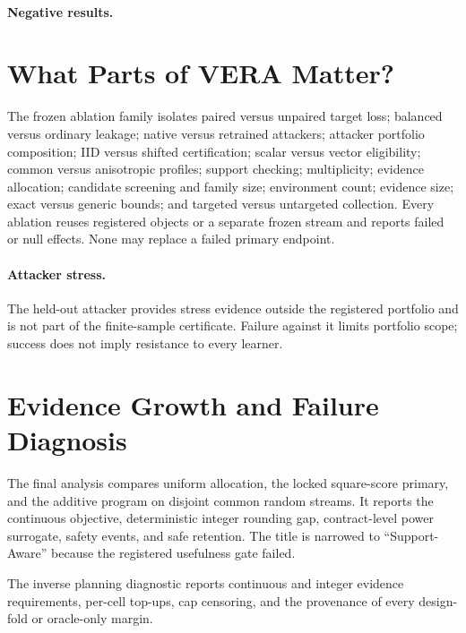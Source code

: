 \paragraph{Negative results.}
\ControlledNegativeResults

\section{What Parts of VERA Matter?}
\label{iclr:sec:ablations}

The frozen ablation family isolates paired versus unpaired target loss;
balanced versus ordinary leakage; native versus retrained attackers; attacker
portfolio composition; IID versus shifted certification; scalar versus vector
eligibility; common versus anisotropic profiles; support checking;
multiplicity; evidence allocation; candidate screening and family size;
environment count; evidence size; exact versus generic bounds; and targeted
versus untargeted collection. Every ablation reuses registered objects or a
separate frozen stream and reports failed or null effects. None may replace a
failed primary endpoint.

\paragraph{Attacker stress.}
\ControlledHeldoutResult{} The held-out attacker provides stress evidence outside
the registered portfolio and is not part of the finite-sample certificate.
Failure against it limits portfolio scope; success does not imply resistance to
every learner.

\section{Evidence Growth and Failure Diagnosis}
\label{iclr:sec:diagnosis}

\ControlledAllocationResult{} The final analysis compares uniform allocation,
the locked square-score primary, and the additive program on disjoint common
random streams. It reports the continuous objective, deterministic integer
rounding gap, contract-level power surrogate, safety events, and safe retention.
The title is narrowed to ``Support-Aware'' because the registered usefulness
gate failed.

\ControlledEvidenceResult{} The inverse planning diagnostic reports continuous
and integer evidence requirements, per-cell top-ups, cap censoring, and the
provenance of every design-fold or oracle-only margin.

